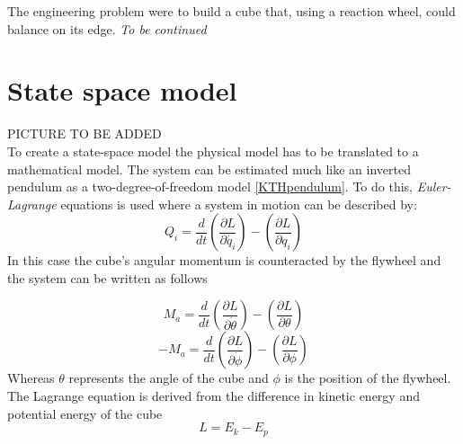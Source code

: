 \documentclass[a4paper,11pt]{kth-mag}
\begin{document}
The engineering problem were to build a cube that, using a reaction wheel, could balance on its edge.
\emph{To be continued}
\section{State space model}
PICTURE TO BE ADDED
\\
To create a state-space model the physical model has to be translated to a mathematical model. The system can be estimated much like an inverted pendulum as a two-degree-of-freedom model \ref{KTHpendulum}. To do this, \emph{Euler-Lagrange} equations is used where a system in motion can be described by:
\begin{equation}
Q_i=\frac{d}{dt}\left(\frac{\partial L}{\partial \dot{q_i}}\right)-\left(\frac{\partial L}{\partial q_i}\right)
\end{equation}
In this case the cube's angular momentum is counteracted by the flywheel and the system can be written as follows

\begin{equation} \label{eq:positiveL}
M_a=\frac{d}{dt}\left(\frac{\partial L}{\partial \dot{\theta}}\right)-\left(\frac{\partial L}{\partial \theta}\right)
\end{equation}
\begin{equation} \label{eq:negativeL}
-M_a=\frac{d}{dt}\left(\frac{\partial L}{\partial \dot{\phi}}\right)-\left(\frac{\partial L}{\partial \phi}\right)
\end{equation}
Whereas $\theta$ represents the angle of the cube and $\phi$ is the position of the flywheel. \\
The Lagrange equation is derived from the difference in kinetic energy and potential energy of the cube
\begin{equation} \label{eq:Lagrange}
L = E_k - E_p
\end{equation}
\end{document}
